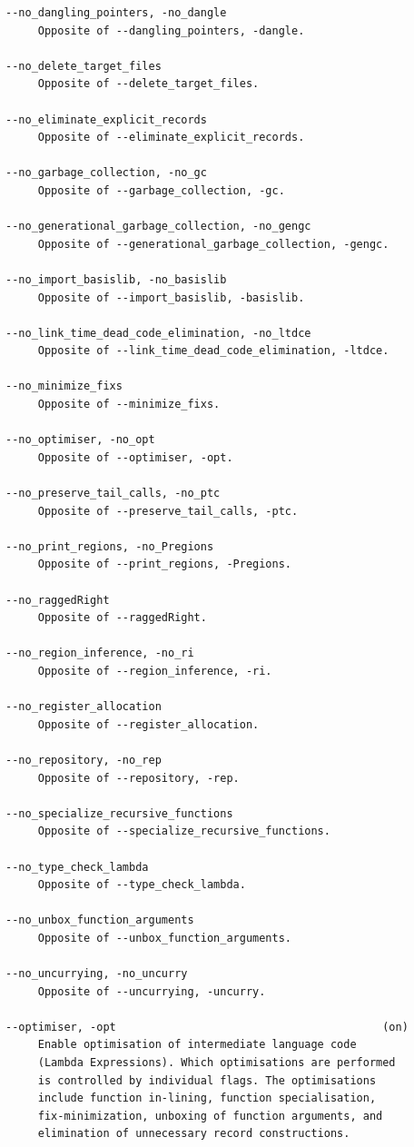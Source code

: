 \documentclass[12pt]{book}
\begin{document}
\begin{verbatim}
--no_dangling_pointers, -no_dangle 
     Opposite of --dangling_pointers, -dangle.

--no_delete_target_files 
     Opposite of --delete_target_files.

--no_eliminate_explicit_records 
     Opposite of --eliminate_explicit_records.

--no_garbage_collection, -no_gc 
     Opposite of --garbage_collection, -gc.

--no_generational_garbage_collection, -no_gengc 
     Opposite of --generational_garbage_collection, -gengc.

--no_import_basislib, -no_basislib 
     Opposite of --import_basislib, -basislib.

--no_link_time_dead_code_elimination, -no_ltdce 
     Opposite of --link_time_dead_code_elimination, -ltdce.

--no_minimize_fixs 
     Opposite of --minimize_fixs.

--no_optimiser, -no_opt 
     Opposite of --optimiser, -opt.

--no_preserve_tail_calls, -no_ptc 
     Opposite of --preserve_tail_calls, -ptc.

--no_print_regions, -no_Pregions 
     Opposite of --print_regions, -Pregions.

--no_raggedRight 
     Opposite of --raggedRight.

--no_region_inference, -no_ri 
     Opposite of --region_inference, -ri.

--no_register_allocation 
     Opposite of --register_allocation.

--no_repository, -no_rep 
     Opposite of --repository, -rep.

--no_specialize_recursive_functions 
     Opposite of --specialize_recursive_functions.

--no_type_check_lambda 
     Opposite of --type_check_lambda.

--no_unbox_function_arguments 
     Opposite of --unbox_function_arguments.

--no_uncurrying, -no_uncurry 
     Opposite of --uncurrying, -uncurry.

--optimiser, -opt                                         (on)
     Enable optimisation of intermediate language code
     (Lambda Expressions). Which optimisations are performed
     is controlled by individual flags. The optimisations
     include function in-lining, function specialisation,
     fix-minimization, unboxing of function arguments, and
     elimination of unnecessary record constructions.


\end{verbatim}
\end{document}
